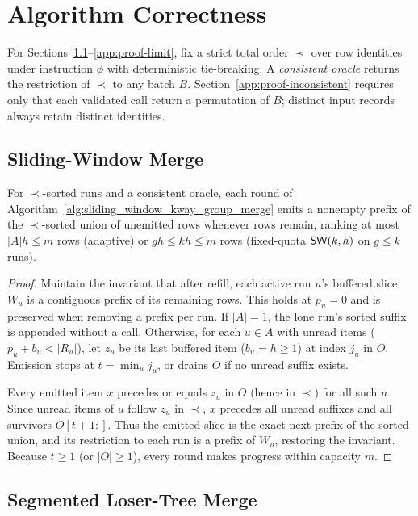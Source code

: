 \section{Algorithm Correctness}
\label{app:algorithm-proofs}

For Sections~\ref{app:proof-sw}--\ref{app:proof-limit}, fix a strict total order $\prec$ over row identities under instruction $\phi$ with deterministic tie-breaking. A \emph{consistent oracle} returns the restriction of $\prec$ to any batch $B$. Section~\ref{app:proof-inconsistent} requires only that each validated call return a permutation of $B$; distinct input records always retain distinct identities.

\subsection{Sliding-Window Merge}
\label{app:proof-sw}

\begin{lemma}
\label{lem:sw-safe}
For $\prec$-sorted runs and a consistent oracle, each round of Algorithm~\ref{alg:sliding_window_kway_group_merge} emits a nonempty prefix of the $\prec$-sorted union of unemitted rows whenever rows remain, ranking at most $|A|h \le m$ rows (adaptive) or $gh \le kh \le m$ rows (fixed-quota ${\mathsf{SW}}{}(k,h)$ on $g \le k$ runs).
\end{lemma}
\begin{proof}
Maintain the invariant that after refill, each active run $u$'s buffered slice $W_u$ is a contiguous prefix of its remaining rows. This holds at $p_u = 0$ and is preserved when removing a prefix per run. If $|A|=1$, the lone run's sorted suffix is appended without a call. Otherwise, for each $u \in A$ with unread items ($p_u + b_u < |R_u|$), let $z_u$ be its last buffered item ($b_u = h \ge 1$) at index $j_u$ in $O$. Emission stops at $t = \min_u j_u$, or drains $O$ if no unread suffix exists.

Every emitted item $x$ precedes or equals $z_u$ in $O$ (hence in $\prec$) for all such $u$. Since unread items of $u$ follow $z_u$ in $\prec$, $x$ precedes all unread suffixes and all survivors $O[t{+}1:]$. Thus the emitted slice is the exact next prefix of the sorted union, and its restriction to each run is a prefix of $W_u$, restoring the invariant. Because $t \ge 1$ (or $|O| \ge 1$), every round makes progress within capacity $m$.
\end{proof}

\subsection{Segmented Loser-Tree Merge}
\label{app:proof-lt}

